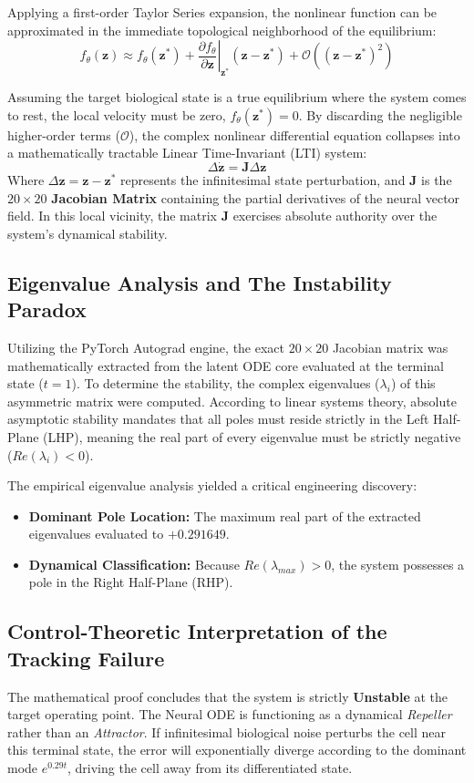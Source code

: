 \documentclass[12pt, a4paper]{article}
\begin{document}
	Applying a first-order Taylor Series expansion, the nonlinear function can be approximated in the immediate topological neighborhood of the equilibrium:
	$$ f_\theta(\mathbf{z}) \approx f_\theta(\mathbf{z}^*) + \left. \frac{\partial f_\theta}{\partial \mathbf{z}} \right|_{\mathbf{z}^*} (\mathbf{z} - \mathbf{z}^*) + \mathcal{O}((\mathbf{z} - \mathbf{z}^*)^2) $$
	
	Assuming the target biological state is a true equilibrium where the system comes to rest, the local velocity must be zero, $f_\theta(\mathbf{z}^*) = 0$. By discarding the negligible higher-order terms ($\mathcal{O}$), the complex nonlinear differential equation collapses into a mathematically tractable Linear Time-Invariant (LTI) system:
	$$ \Delta \dot{\mathbf{z}} = \mathbf{J} \Delta \mathbf{z} $$
	Where $\Delta \mathbf{z} = \mathbf{z} - \mathbf{z}^*$ represents the infinitesimal state perturbation, and $\mathbf{J}$ is the $20 \times 20$ \textbf{Jacobian Matrix} containing the partial derivatives of the neural vector field. In this local vicinity, the matrix $\mathbf{J}$ exercises absolute authority over the system's dynamical stability.
	
	\subsection{Eigenvalue Analysis and The Instability Paradox}
	Utilizing the PyTorch Autograd engine, the exact $20 \times 20$ Jacobian matrix was mathematically extracted from the latent ODE core evaluated at the terminal state ($t=1$). To determine the stability, the complex eigenvalues ($\lambda_i$) of this asymmetric matrix were computed. According to linear systems theory, absolute asymptotic stability mandates that all poles must reside strictly in the Left Half-Plane (LHP), meaning the real part of every eigenvalue must be strictly negative ($Re(\lambda_i) < 0$).
	
	The empirical eigenvalue analysis yielded a critical engineering discovery:
	\begin{itemize}
		\item \textbf{Dominant Pole Location:} The maximum real part of the extracted eigenvalues evaluated to $+0.291649$.
		\item \textbf{Dynamical Classification:} Because $Re(\lambda_{max}) > 0$, the system possesses a pole in the Right Half-Plane (RHP). 
	\end{itemize}
	
	\subsection{Control-Theoretic Interpretation of the Tracking Failure}
	The mathematical proof concludes that the system is strictly \textbf{Unstable} at the target operating point. The Neural ODE is functioning as a dynamical \textit{Repeller} rather than an \textit{Attractor}. If infinitesimal biological noise perturbs the cell near this terminal state, the error will exponentially diverge according to the dominant mode $e^{0.29t}$, driving the cell away from its differentiated state.
	
\end{document}
